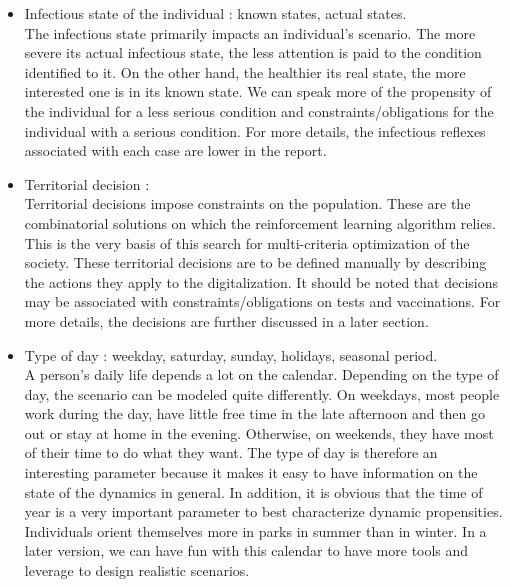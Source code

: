 \begin{itemize}

\item Infectious state of the individual : known states, actual states.\\
The infectious state primarily impacts an individual's scenario. The more severe its actual infectious state, the less attention is paid to the condition identified to it. On the other hand, the healthier its real state, the more interested one is in its known state. We can speak more of the propensity of the individual for a less serious condition and constraints/obligations for the individual with a serious condition. For more details, the infectious reflexes associated with each case are lower in the report.\\

\item Territorial decision :\\
Territorial decisions impose constraints on the population. These are the combinatorial solutions on which the reinforcement learning algorithm relies. This is the very basis of this search for multi-criteria optimization of the society. These territorial decisions are to be defined manually by describing the actions they apply to the digitalization. It should be noted that decisions may be associated with constraints/obligations on tests and vaccinations. For more details, the decisions are further discussed in a later section.\\

\item Type of day : weekday, saturday, sunday, holidays, seasonal period.\\
A person's daily life depends a lot on the calendar. Depending on the type of day, the scenario can be modeled quite differently. On weekdays, most people work during the day, have little free time in the late afternoon and then go out or stay at home in the evening. Otherwise, on weekends, they have most of their time to do what they want. The type of day is therefore an interesting parameter because it makes it easy to have information on the state of the dynamics in general. In addition, it is obvious that the time of year is a very important parameter to best characterize dynamic propensities. Individuals orient themselves more in parks in summer than in winter. In a later version, we can have fun with this calendar to have more tools and leverage to design realistic scenarios.\\


\end{itemize}
